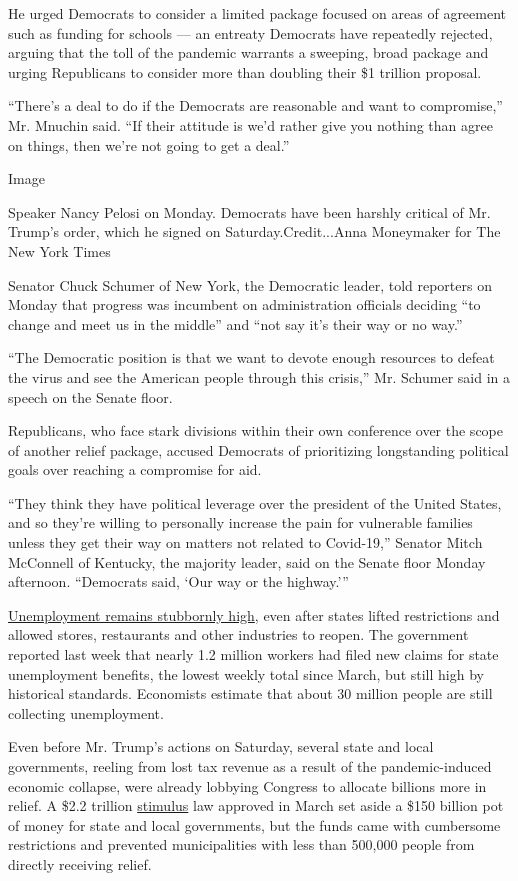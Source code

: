He urged Democrats to consider a limited package focused on areas of
agreement such as funding for schools --- an entreaty Democrats have
repeatedly rejected, arguing that the toll of the pandemic warrants a
sweeping, broad package and urging Republicans to consider more than
doubling their \$1 trillion proposal.

``There's a deal to do if the Democrats are reasonable and want to
compromise,'' Mr. Mnuchin said. ``If their attitude is we'd rather give
you nothing than agree on things, then we're not going to get a deal.''

Image

Speaker Nancy Pelosi on Monday. Democrats have been harshly critical of
Mr. Trump's order, which he signed on Saturday.Credit...Anna Moneymaker
for The New York Times

Senator Chuck Schumer of New York, the Democratic leader, told reporters
on Monday that progress was incumbent on administration officials
deciding ``to change and meet us in the middle'' and ``not say it's
their way or no way.''

``The Democratic position is that we want to devote enough resources to
defeat the virus and see the American people through this crisis,'' Mr.
Schumer said in a speech on the Senate floor.

Republicans, who face stark divisions within their own conference over
the scope of another relief package, accused Democrats of prioritizing
longstanding political goals over reaching a compromise for aid.

``They think they have political leverage over the president of the
United States, and so they're willing to personally increase the pain
for vulnerable families unless they get their way on matters not related
to Covid-19,'' Senator Mitch McConnell of Kentucky, the majority leader,
said on the Senate floor Monday afternoon. ``Democrats said, `Our way or
the highway.'''

\href{https://www.nytimes3xbfgragh.onion/2020/08/06/business/economy/unemployment-claims.html}{Unemployment
remains stubbornly high}, even after states lifted restrictions and
allowed stores, restaurants and other industries to reopen. The
government reported last week that nearly 1.2 million workers had filed
new claims for state unemployment benefits, the lowest weekly total
since March, but still high by historical standards. Economists estimate
that about 30 million people are still collecting unemployment.

Even before Mr. Trump's actions on Saturday, several state and local
governments, reeling from lost tax revenue as a result of the
pandemic-induced economic collapse, were already lobbying Congress to
allocate billions more in relief. A \$2.2 trillion
\href{https://www.nytimes3xbfgragh.onion/2020/08/13/business/economy/unemployment-benefits-coronavirus.html}{stimulus}
law approved in March set aside a \$150 billion pot of money for state
and local governments, but the funds came with cumbersome restrictions
and prevented municipalities with less than 500,000 people from directly
receiving relief.

